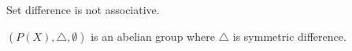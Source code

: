 Set difference is not associative.


$(P(X), \triangle, \emptyset)$ is an abelian group
where $\triangle$ is symmetric difference.


